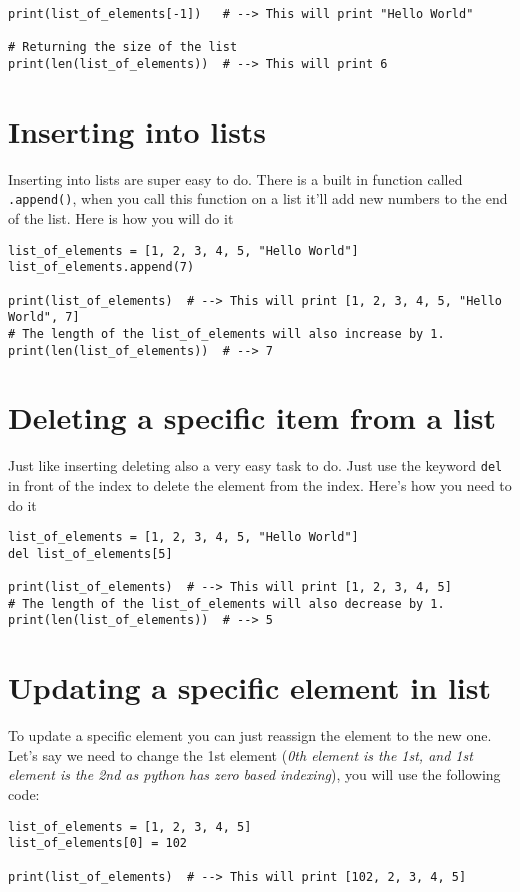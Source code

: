 \noindent\begin{minipage}{\linewidth}
\begin{lstlisting}[style=python]
print(list_of_elements[-1])   # --> This will print "Hello World"

# Returning the size of the list
print(len(list_of_elements))  # --> This will print 6
\end{lstlisting}
\end{minipage}

\section{Inserting into lists}
\noindent Inserting into lists are super easy to do. There is a built in function called \texttt{.append()}, when you call this function on a list it'll add new numbers to the end of the list. Here is how you will do it

\noindent\begin{minipage}{\linewidth}
\begin{lstlisting}[style=python]
list_of_elements = [1, 2, 3, 4, 5, "Hello World"]
list_of_elements.append(7)

print(list_of_elements)  # --> This will print [1, 2, 3, 4, 5, "Hello World", 7]
# The length of the list_of_elements will also increase by 1.
print(len(list_of_elements))  # --> 7
\end{lstlisting}
\end{minipage}


\section{Deleting a specific item from a list}
\noindent Just like inserting deleting also a very easy task to do. Just use the keyword \texttt{del} in front of the index to delete the element from the index. Here's how you need to do it

\noindent\begin{minipage}{\linewidth}
\begin{lstlisting}[style=python]
list_of_elements = [1, 2, 3, 4, 5, "Hello World"]
del list_of_elements[5]

print(list_of_elements)  # --> This will print [1, 2, 3, 4, 5]
# The length of the list_of_elements will also decrease by 1.
print(len(list_of_elements))  # --> 5
\end{lstlisting}
\end{minipage}

\section{Updating a specific element in list}
\noindent To update a specific element you can just reassign the element to the new one. Let's say we need to change the 1st element (\textit{0th element is the 1st, and 1st element is the 2nd as python has zero based indexing}), you will use the following code:

\noindent\begin{minipage}{\linewidth}
\begin{lstlisting}[style=python]
list_of_elements = [1, 2, 3, 4, 5]
list_of_elements[0] = 102

print(list_of_elements)  # --> This will print [102, 2, 3, 4, 5]
\end{lstlisting}
\end{minipage}